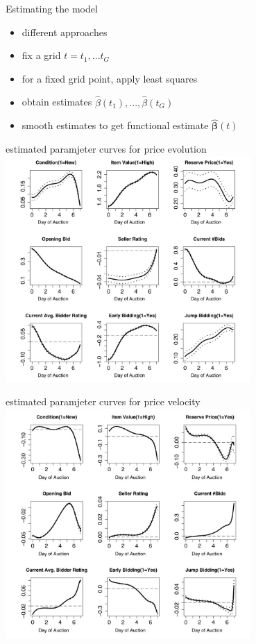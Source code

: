 \documentclass[hyperref={pdfpagelabels=false}]{beamer}
\begin{document}
\begin{frame}{Estimating the model}
\begin{itemize}
\item different approaches
\item fix a grid $t=t_1,...t_G$
\item for a fixed grid point, apply least squares
\item obtain estimates $\hat{\beta}(t_1),...,\hat{\beta}(t_G)$ 
\item smooth estimates to get functional estimate $\mathbf{\hat{\pmb{\beta}}}(t)$ 
\end{itemize}
\end{frame}

\begin{frame}{estimated paramjeter curves for price evolution} %
\center
\includegraphics[width=0.7\textwidth]{price_evolution}
\end{frame}

\begin{frame}{estimated paramjeter curves for price velocity}
\center
\includegraphics[width=0.7\textwidth]{price_velocity}
\end{frame}
\end{document}
